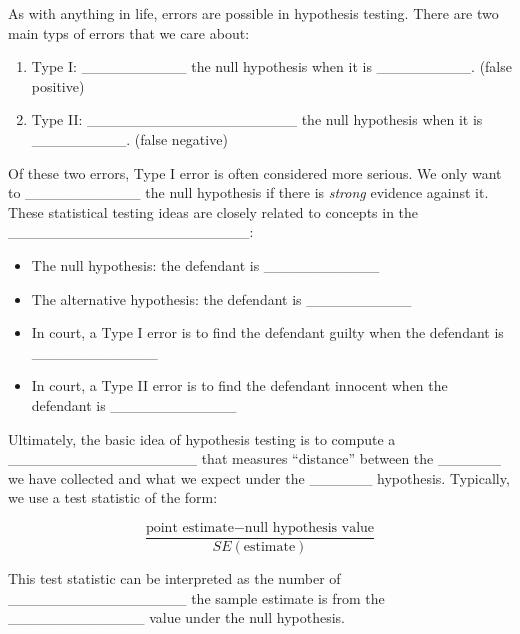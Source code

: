 \documentclass[]{book}
\providecommand{\tightlist}{%
  \setlength{\itemsep}{0pt}\setlength{\parskip}{0pt}}
\theoremstyle{definition}
\theoremstyle{definition}
\theoremstyle{remark}
\begin{document}
As with anything in life, errors are possible in hypothesis testing.
There are two main typs of errors that we care about:

\begin{enumerate}
\def\labelenumi{\arabic{enumi}.}
\tightlist
\item
  Type I: \_\_\_\_\_\_\_\_\_\_ the null hypothesis when it is
  \_\_\_\_\_\_\_\_\_. (false positive) \vspace{.1in}
\item
  Type II: \_\_\_\_\_\_\_\_\_\_\_\_\_\_\_\_\_\_\_\_ the null hypothesis
  when it is \_\_\_\_\_\_\_\_\_. (false negative) \vspace{.1in}
\end{enumerate}

Of these two errors, Type I error is often considered more serious. We
only want to \_\_\_\_\_\_\_\_\_\_\_ the null hypothesis if there is
\emph{strong} evidence against it. These statistical testing ideas are
closely related to concepts in the
\_\_\_\_\_\_\_\_\_\_\_\_\_\_\_\_\_\_\_\_\_\_\_:

\begin{itemize}
\tightlist
\item
  The null hypothesis: the defendant is \_\_\_\_\_\_\_\_\_\_\_
  \vspace{.1in}
\item
  The alternative hypothesis: the defendant is \_\_\_\_\_\_\_\_\_\_
  \vspace{.1in}
\item
  In court, a Type I error is to find the defendant guilty when the
  defendant is \_\_\_\_\_\_\_\_\_\_\_\_ \vspace{.1in}
\item
  In court, a Type II error is to find the defendant innocent when the
  defendant is \_\_\_\_\_\_\_\_\_\_\_\_
\end{itemize}

Ultimately, the basic idea of hypothesis testing is to compute a
\_\_\_\_\_\_\_\_\_\_\_\_\_\_\_\_\_\_ that measures ``distance'' between
the \_\_\_\_\_\_ we have collected and what we expect under the
\_\_\_\_\_\_ hypothesis. Typically, we use a test statistic of the form:

\begin{equation}\label{eq:teststat}
\frac{\text{point estimate} - \text{null hypothesis value}}{SE(\text{estimate})}
\end{equation}

This test statistic can be interpreted as the number of
\_\_\_\_\_\_\_\_\_\_\_\_\_\_\_\_\_ the sample estimate is from the
\_\_\_\_\_\_\_\_\_\_\_\_\_ value under the null hypothesis.
\end{document}
